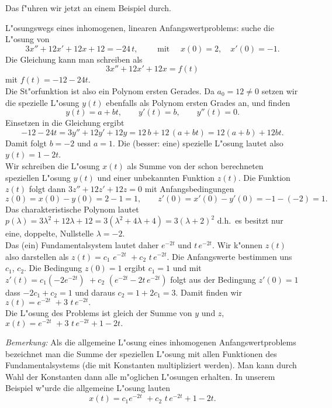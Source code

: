 Das f"uhren wir jetzt an einem Beispiel durch.\par\medskip
\begin{bspX}
L"osungswegs eines inhomogenen, linearen Anfangswertproblems: suche
die L"osung von 
$$ 3 x'' + 12 x' + 12 x + 12 = -24\, t,\qquad
\mbox{ mit }\quad x(0) = 2,\quad x'(0) = -1.$$
 Die Gleichung kann man schreiben als
$$ 3 x'' + 12 x' + 12 x =f(t) $$
mit $ f(t) = -12-24 t$.\\
Die St"orfunktion ist also ein Polynom  ersten Gerades. 
Da $a_0=12\not=0$ setzen wir die spezielle L"osung
$y(t)$ ebenfalls als Polynom ersten Grades an, und finden
$$ y(t) = a + bt,\qquad y'(t) = b,\qquad y''(t) = 0.$$
Einsetzen in die Gleichung ergibt
$$ -12-24 t = 3y''+12y'+12y = 12\, b + 12\, (a+bt) = 12 (a+b) + 12 b t.$$
Damit folgt $b=-2$ und $a = 1$. Die (besser: eine) spezielle L"osung lautet also $y(t) = 1-2t$.\\
 Wir schreiben die L"osung $x(t)$ als Summe von der 
schon berechneten speziellen L"osung $y(t)$ und einer unbekannten Funktion $z(t)$. 
Die Funktion $z(t)$ folgt dann
$ 3 z'' + 12 z' + 12 z = 0$
mit Anfangsbedingungen
$ z(0) = x(0)-y(0) = 2-1=1,\qquad z'(0) = x'(0)-y'(0) = -1-(-2)=1.$\\
Das charakteristische Polynom lautet
$ p(\lambda) = 3\lambda^2+12\lambda+12 = 3(\lambda^2+4\lambda+4) = 3(\lambda+2)^2$
d.h.\ es besitzt nur eine, doppelte, Nullstelle $\lambda=-2$. \\
Das (ein) Fundamentalsystem lautet daher
$ e^{-2t}$ und $t\,e^{-2t}.$
Wir k"onnen $z(t)$ also darstellen als
$ z(t) = c_1 \,\, e^{-2t} \,\,+ c_2\,\, t\,e^{-2t}.$
Die Anfangswerte bestimmen uns $c_1$, $c_2$. Die Bedingung $z(0) = 1$ ergibt
$ c_1 = 1$ und mit $z'(t) = c_1(-2 e^{-2t}) \,\,+ c_2\,\,(e^{-2t}-2t \,e^{-2t})$ folgt aus der Bedingung $z'(0) = 1$
dass
$ -2c_1+c_2 =1$ und daraus $c_2 = 1+2 c_1 = 3.$
Damit finden wir
$ z(t) =  e^{-2t} \,\,+ 3\,\, t\,e^{-2t}.$\\
 Die L"osung des Problems ist gleich der Summe 
von $y$ und $z$, $ x(t) =  e^{-2t} \,\,+ 3\,\, t\,e^{-2t} + 1-2t.$
\end{bspX}
{\it Bemerkung:} Als die allgemeine L"osung eines inhomogenen Anfangswertproblems 
bezeichnet man die Summe der speziellen L"osung mit allen Funktionen des Fundamentalsystems (die
mit Konstanten multipliziert werden). Man kann durch Wahl der Konstanten dann alle m"oglichen
L"osungen erhalten. In unserem Beispiel w"urde die allgemeine L"osung lauten
$$ x(t) = c_1 e^{-2t} \,\,+ c_2\,\, t\,e^{-2t} + 1-2t.$$
